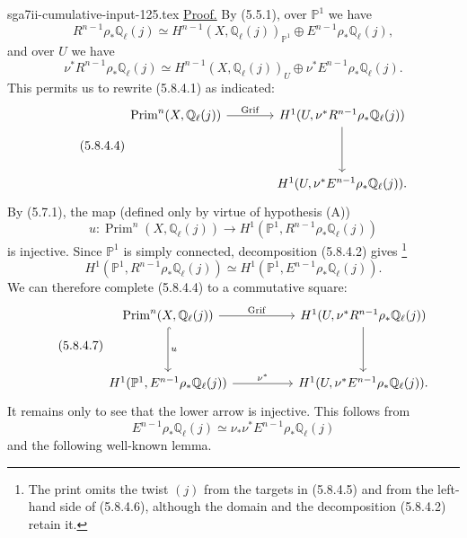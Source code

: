 \begin{filecontents*}{sga7ii-cumulative-input-125.tex}
\underline{Proof.}
By (5.5.1), over $\mathbb P^1$ we have
\begin{equation}\tag{5.8.4.2}
R^{n-1}\rho_*\mathbb Q_\ell(j)
\simeq
H^{n-1}(X,\mathbb Q_\ell(j))_{\mathbb P^1}
\oplus E^{n-1}\rho_*\mathbb Q_\ell(j),
\end{equation}
and over $U$ we have
\begin{equation}\tag{5.8.4.3}
\nu^*R^{n-1}\rho_*\mathbb Q_\ell(j)
\simeq
H^{n-1}(X,\mathbb Q_\ell(j))_U
\oplus \nu^*E^{n-1}\rho_*\mathbb Q_\ell(j).
\end{equation}
This permits us to rewrite (5.8.4.1) as indicated:
\begin{equation}\tag{5.8.4.4}
\begin{tikzcd}[row sep=huge,column sep=large]
\operatorname{Prim}^n(X,\mathbb Q_\ell(j))
  \arrow[r,"\operatorname{Grif}"]
&
H^1(U,\nu^*R^{n-1}\rho_*\mathbb Q_\ell(j))
  \arrow[d]
\\
{}
&
H^1(U,\nu^*E^{n-1}\rho_*\mathbb Q_\ell(j)).
\end{tikzcd}
\end{equation}
By (5.7.1), the map (defined only by virtue of hypothesis (A))
\begin{equation}\tag{5.8.4.5}
u:\operatorname{Prim}^n(X,\mathbb Q_\ell(j))
\longrightarrow
H^1(\mathbb P^1,R^{n-1}\rho_*\mathbb Q_\ell(j))
\end{equation}
is injective.  Since $\mathbb P^1$ is simply connected, decomposition
(5.8.4.2) gives
\footnote{The print omits the twist $(j)$ from the targets in (5.8.4.5)
and from the left-hand side of (5.8.4.6), although the domain and the
decomposition (5.8.4.2) retain it.}
\begin{equation}\tag{5.8.4.6}
H^1(\mathbb P^1,R^{n-1}\rho_*\mathbb Q_\ell(j))
\simeq
H^1(\mathbb P^1,E^{n-1}\rho_*\mathbb Q_\ell(j)).
\end{equation}
We can therefore complete (5.8.4.4) to a commutative square:
\begin{equation}\tag{5.8.4.7}
\begin{tikzcd}[column sep=huge,row sep=huge]
\operatorname{Prim}^n(X,\mathbb Q_\ell(j))
  \arrow[r,"\operatorname{Grif}"]
  \arrow[d,hook,"u"]
&
H^1(U,\nu^*R^{n-1}\rho_*\mathbb Q_\ell(j))
  \arrow[d]
\\
H^1(\mathbb P^1,E^{n-1}\rho_*\mathbb Q_\ell(j))
  \arrow[r,"\nu^*"]
&
H^1(U,\nu^*E^{n-1}\rho_*\mathbb Q_\ell(j)).
\end{tikzcd}
\end{equation}
It remains only to see that the lower arrow is injective.  This follows from
\begin{equation}\tag{5.8.4.8}
E^{n-1}\rho_*\mathbb Q_\ell(j)
\simeq
\nu_*\nu^*E^{n-1}\rho_*\mathbb Q_\ell(j)
\end{equation}
and the following well-known lemma.


\end{filecontents*}
